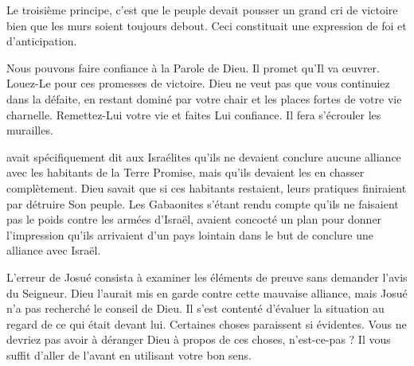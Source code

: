 
Le troisième principe, c'est que le peuple devait pousser
 un grand cri de victoire \ocadr bien que les murs soient toujours debout.
 Ceci constituait une expression de foi et d'anticipation.

Nous pouvons faire confiance à la Parole de Dieu. Il promet qu'Il va œuvrer.
 Louez-Le pour ces promesses de victoire.
 Dieu ne veut pas que vous continuiez dans la défaite,
 en restant dominé par votre chair et les places fortes de votre vie charnelle.
 Remettez-Lui votre vie et faites Lui confiance.
 Il fera s'écrouler les murailles. 

\dvrule






 avait spécifiquement dit aux Israélites
 qu'ils ne devaient conclure aucune alliance avec les habitants
 de la Terre Promise, mais qu'ils devaient les en chasser complètement.
 Dieu savait que si ces habitants restaient, leurs pratiques finiraient
 par détruire Son peuple.
 Les Gabaonites s'étant rendu compte qu'ils ne faisaient
 pas le poids contre les armées d'Israël,
 avaient concocté un plan pour donner l'impression
 qu'ils arrivaient d'un pays lointain
 dans le but de conclure une alliance avec Israël.

L'erreur de Josué consista à examiner les éléments de preuve
 sans demander l'avis du Seigneur.
 Dieu l'aurait mis en garde contre cette mauvaise alliance,
 mais Josué n'a pas recherché le conseil de Dieu.
 Il s'est contenté d'évaluer la situation au regard de ce qui était devant lui.
 Certaines choses paraissent si évidentes.
 Vous ne devriez pas avoir à déranger Dieu à propos de ces choses,
 n'est-ce-pas ?
 Il vous suffit d'aller de l'avant en utilisant votre bon sens.

